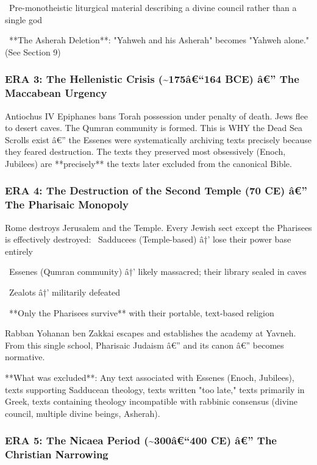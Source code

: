\documentclass[aps,prd,11pt,onecolumn,superscriptaddress,nofootinbib,floatfix]{revtex4-2}
\begin{document}
\textbullet~Pre-monotheistic liturgical material describing a divine council rather than a single god

\textbullet~**The Asherah Deletion**: "Yahweh and his Asherah" becomes "Yahweh alone." (See Section 9)



\subsubsection{ERA 3: The Hellenistic Crisis (\textasciitilde{}175â€``164 BCE) â€'' The Maccabean Urgency}


Antiochus IV Epiphanes bans Torah possession under penalty of death. Jews flee to desert caves. The Qumran community is formed. This is WHY the Dead Sea Scrolls exist â€'' the Essenes were systematically archiving texts precisely because they feared destruction. The texts they preserved most obsessively (Enoch, Jubilees) are **precisely** the texts later excluded from the canonical Bible.


\subsubsection{ERA 4: The Destruction of the Second Temple (70 CE) â€'' The Pharisaic Monopoly}


Rome destroys Jerusalem and the Temple. Every Jewish sect except the Pharisees is effectively destroyed:
\textbullet~Sadducees (Temple-based) â†' lose their power base entirely

\textbullet~Essenes (Qumran community) â†' likely massacred; their library sealed in caves

\textbullet~Zealots â†' militarily defeated

\textbullet~**Only the Pharisees survive** with their portable, text-based religion



Rabban Yohanan ben Zakkai escapes and establishes the academy at Yavneh. From this single school, Pharisaic Judaism â€'' and its canon â€'' becomes normative.


**What was excluded**: Any text associated with Essenes (Enoch, Jubilees), texts supporting Sadducean theology, texts written "too late," texts primarily in Greek, texts containing theology incompatible with rabbinic consensus (divine council, multiple divine beings, Asherah).


\subsubsection{ERA 5: The Nicaea Period (\textasciitilde{}300â€``400 CE) â€'' The Christian Narrowing}
\end{document}
